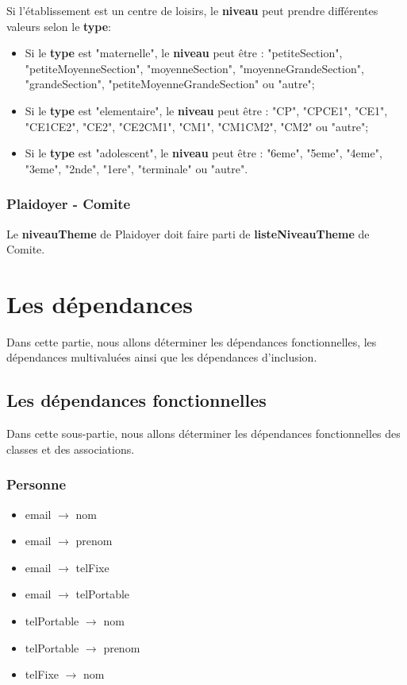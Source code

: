 \documentclass[asi, sansVersion]{picInsa}
\begin{document}
Si l'établissement est un centre de loisirs, le \textbf{niveau} peut prendre différentes valeurs selon le \textbf{type}:
\begin{itemize}
\item Si le \textbf{type} est "maternelle", le \textbf{niveau} peut être : "petiteSection", "petiteMoyenneSection", "moyenneSection", "moyenneGrandeSection", "grandeSection", "petiteMoyenneGrandeSection" ou "autre";
\item Si le \textbf{type} est "elementaire", le \textbf{niveau} peut être : "CP", "CPCE1", "CE1", "CE1CE2", "CE2", "CE2CM1", "CM1", "CM1CM2", "CM2" ou "autre";
\item Si le \textbf{type} est "adolescent", le \textbf{niveau} peut être : "6eme", "5eme", "4eme", "3eme", "2nde", "1ere", "terminale" ou "autre". 
\end{itemize}

\subsection*{Plaidoyer - Comite}
Le \textbf{niveauTheme} de Plaidoyer doit faire parti de \textbf{listeNiveauTheme} de Comite.  

\chapter{Les dépendances}

Dans cette partie, nous allons déterminer les dépendances fonctionnelles, les dépendances multivaluées ainsi que les dépendances d'inclusion. \\

\section{Les dépendances fonctionnelles}

Dans cette sous-partie, nous allons déterminer les dépendances fonctionnelles des classes et des associations.  

\subsection*{Personne}
\begin{itemize}
\item[] email $\rightarrow$ nom 
\item[] email $\rightarrow$ prenom 
\item[] email $\rightarrow$ telFixe 
\item[] email $\rightarrow$ telPortable 
\item[] telPortable $\rightarrow$ nom
\item[] telPortable $\rightarrow$ prenom
\item[] telFixe $\rightarrow$ nom
\end{itemize}
\end{document}
